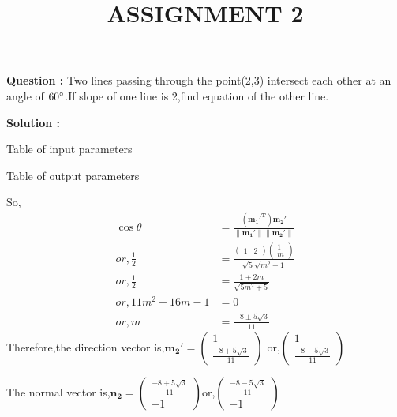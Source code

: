 \documentclass[12pt]{article}
\let\vec\mathbf
\providecommand{\norm}[1]{\ensuremath{\lVert#1\rVert}}
\begin{document}
\title{\textbf{ASSIGNMENT 2}}
\date{}
\maketitle
\textbf{Question :} Two lines passing through the point(2,3) intersect each other at an angle of $60\degree$.If slope of one line is 2,find equation of the other line.

\textbf{Solution :}

\begin{table}[H]
    \centering
    
    \caption{Table of input parameters}
    \label{tab:1}
\end{table}



\begin{table}[H]
    \centering
    
    \caption{Table of output parameters}
    \label{tab:2}
\end{table}

So,
\begin{align}
  \cos{\theta}&=\frac{\vec{(m_1'^T)m_2'}}{\vec{\norm{m_1'}\norm{m_2'}}}\\
    or,\frac{1}{2}&=\frac{\begin{pmatrix}
        1&2
    \end{pmatrix}\begin{pmatrix}
        1\\m
    \end{pmatrix}}{\sqrt{5}\sqrt{m^2+1}}\\
   or, \frac{1}{2}&=\frac{1+2m}{\sqrt{5m^2+5}}\\
   or,11m^2+16m-1&=0\\
   or, m&=\frac{-8\pm5\sqrt{3}}{11}    
\end{align}
Therefore,the direction vector is,$\vec{m_2'}=\begin{pmatrix}
    1\\\frac{-8+5\sqrt{3}}{11}
\end{pmatrix}$ or,$\begin{pmatrix}
    1\\\frac{-8-5\sqrt{3}}{11}\end{pmatrix}$

The normal vector is,$\vec{n_2}=\begin{pmatrix}
    \frac{-8+5\sqrt{3}}{11}\\-1
\end{pmatrix}$or,$\begin{pmatrix}
    \frac{-8-5\sqrt{3}}{11}\\-1
\end{pmatrix}$
\end{document}

